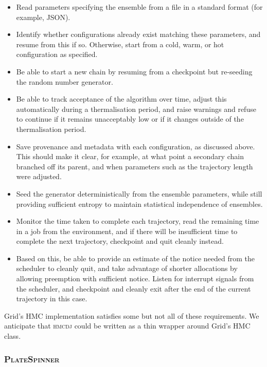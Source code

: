 \documentclass{article}
\newcommand\program[1]{\textsc{#1}\xspace}
\begin{document}
\begin{itemize}
  \item
        Read parameters specifying the ensemble from a file in a standard format
        (for example, JSON).
  \item
        Identify whether configurations already exist matching these parameters,
        and resume from this if so.
        Otherwise,
        start from a cold, warm, or hot configuration as specified.
  \item
        Be able to start a new chain by resuming from a checkpoint
        but re-seeding the random number generator.
  \item
        Be able to track acceptance of the algorithm over time,
        adjust this automatically during a thermalisation period,
        and raise warnings and refuse to continue if it remains unacceptably low
        or if it changes outside of the thermalisation period.
  \item
        Save provenance and metadata with each configuration,
        as discussed above.
        This should make it clear,
        for example,
        at what point a secondary chain branched off its parent,
        and when parameters such as the trajectory length were adjusted.
  \item
        Seed the generator deterministically from the ensemble parameters,
        while still providing sufficient entropy to maintain statistical independence of ensembles.
  \item
        Monitor the time taken to complete each trajectory,
        read the remaining time in a job from the environment,
        and if there will be insufficient time to complete the next trajectory,
        checkpoint and quit cleanly instead.
  \item
        Based on this,
        be able to provide an estimate of the notice needed from the scheduler to cleanly quit,
        and take advantage of shorter allocations by allowing preemption with sufficient notice.
        Listen for interrupt signals from the scheduler,
        and checkpoint and cleanly exit after the end of the current trajectory in this case.
\end{itemize}

Grid's HMC implementation satisfies some but not all of these requirements.
We anticipate that \program{hmcdj} could be written as a thin wrapper around Grid's HMC class.

\subsubsection{\program{PlateSpinner}}
\end{document}
